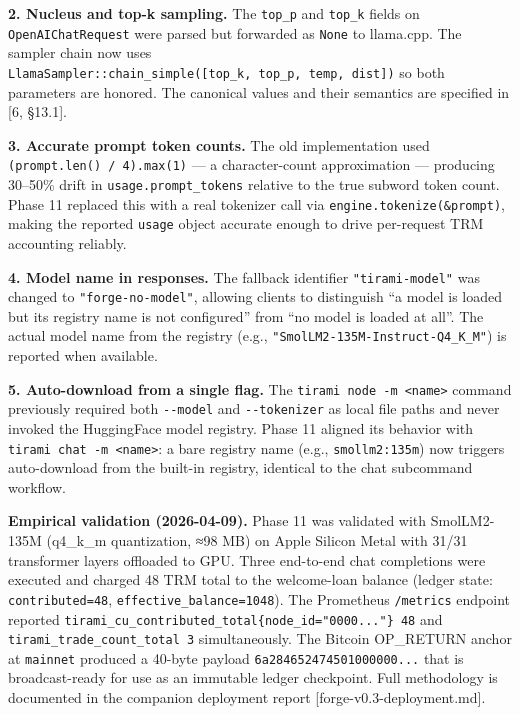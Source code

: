 \documentclass[
  11pt,
]{article}
\begin{document}
\textbf{2. Nucleus and top-k sampling.} The \texttt{top\_p} and
\texttt{top\_k} fields on \texttt{OpenAIChatRequest} were parsed but
forwarded as \texttt{None} to llama.cpp. The sampler chain now uses
\texttt{LlamaSampler::chain\_simple({[}top\_k,\ top\_p,\ temp,\ dist{]})}
so both parameters are honored. The canonical values and their semantics
are specified in {[}6, §13.1{]}.

\textbf{3. Accurate prompt token counts.} The old implementation used
\texttt{(prompt.len()\ /\ 4).max(1)} --- a character-count approximation
--- producing 30--50\% drift in \texttt{usage.prompt\_tokens} relative
to the true subword token count. Phase 11 replaced this with a real
tokenizer call via \texttt{engine.tokenize(\&prompt)}, making the
reported \texttt{usage} object accurate enough to drive per-request TRM
accounting reliably.

\textbf{4. Model name in responses.} The fallback identifier
\texttt{"tirami-model"} was changed to \texttt{"forge-no-model"},
allowing clients to distinguish ``a model is loaded but its registry
name is not configured'' from ``no model is loaded at all''. The actual
model name from the registry (e.g.,
\texttt{"SmolLM2-135M-Instruct-Q4\_K\_M"}) is reported when available.

\textbf{5. Auto-download from a single flag.} The
\texttt{tirami\ node\ -m\ \textless{}name\textgreater{}} command
previously required both \texttt{-\/-model} and \texttt{-\/-tokenizer}
as local file paths and never invoked the HuggingFace model registry.
Phase 11 aligned its behavior with
\texttt{tirami\ chat\ -m\ \textless{}name\textgreater{}}: a bare
registry name (e.g., \texttt{smollm2:135m}) now triggers auto-download
from the built-in registry, identical to the chat subcommand workflow.

\textbf{Empirical validation (2026-04-09).} Phase 11 was validated with
SmolLM2-135M (q4\_k\_m quantization, ≈98 MB) on Apple Silicon Metal with
31/31 transformer layers offloaded to GPU. Three end-to-end chat
completions were executed and charged 48 TRM total to the welcome-loan
balance (ledger state: \texttt{contributed=48},
\texttt{effective\_balance=1048}). The Prometheus \texttt{/metrics}
endpoint reported
\texttt{tirami\_cu\_contributed\_total\{node\_id="0000..."\}\ 48} and
\texttt{tirami\_trade\_count\_total\ 3} simultaneously. The Bitcoin
OP\_RETURN anchor at \texttt{mainnet} produced a 40-byte payload
\texttt{6a284652474501000000...} that is broadcast-ready for use as an
immutable ledger checkpoint. Full methodology is documented in the
companion deployment report {[}forge-v0.3-deployment.md{]}.
\end{document}
